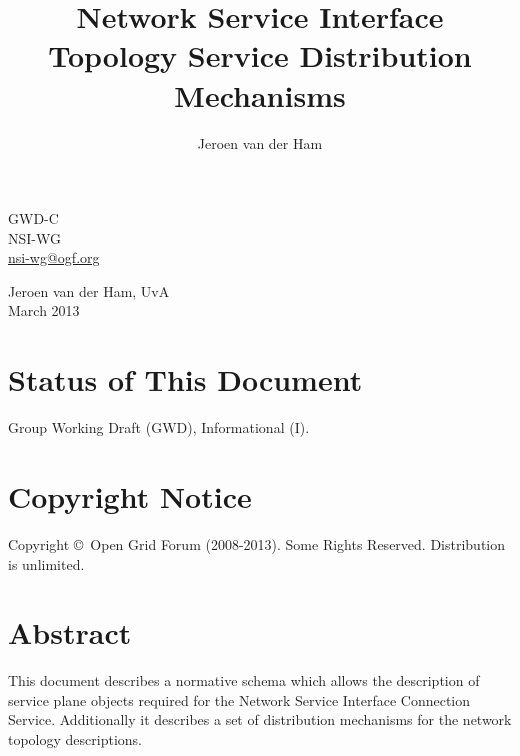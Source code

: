 \documentclass[12pt]{article}  %
\title{Network Service Interface Topology Service Distribution Mechanisms}
\author{Jeroen van der Ham}
\newcommand{\headerstyle}{\sffamily} %
\newcommand{\ifnonempty}[2]{\ifthenelse{\isundefined{#1}}{}{\ifthenelse{\equal{#1}{}}{}{#2}}}
\newcommand{\authorsshort}{Jeroen van der Ham, UvA}
\newcommand{\publicationdate}{March 2013}  %
\newcommand{\copyrightyears}{2008-2013}  %
\newcommand{\docseries}{GWD-C}  %
\begin{document}
{\noindent
\begin{minipage}[t]{1.5in}
\headerstyle
\docseries \\
NSI-WG \\
\href{mailto:nsi-wg@ogf.org}{nsi-wg@ogf.org}
\end{minipage}
\hfill
\raggedleft
\begin{minipage}[t]{4.5in}
\raggedleft
\headerstyle
\authorsshort \\
\vspace{1em}
\publicationdate \\
\ifnonempty{\revisiondate}{Revised \revisiondate \\}
\end{minipage}
}

\vspace{1em}
\begin{center}
\makeatletter
\Large\bf\textsf \@title
\makeatother
\end{center}


\section*{Status of This Document}

Group Working Draft (GWD), Informational (I).


% 

\section*{Copyright Notice}

Copyright \copyright \ Open Grid Forum (\copyrightyears).  Some Rights Reserved.  
Distribution is unlimited.

\section*{Abstract}

This document describes a normative schema which allows the
description of service plane objects required for the Network Service Interface Connection Service. Additionally it describes a set of distribution mechanisms for the network topology descriptions.
\end{document}
